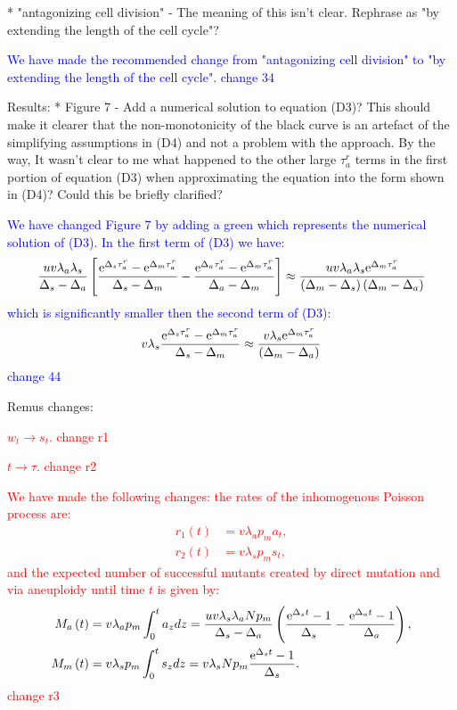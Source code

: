 \documentclass[12pt]{extarticle}
\newcommand{\e}{{\rm e}}
\begin{document}
* "antagonizing cell division" - The meaning of this isn't clear. Rephrase as "by extending the length of the cell cycle"?

\textcolor{blue}{We have made the recommended change from "antagonizing cell division" to "by extending the length of the cell cycle". change 34} 

Results:
* Figure 7 - Add a numerical solution to equation (D3)? This should make it clearer that the non-monotonicity of the black curve is an artefact of the simplifying assumptions in (D4) and not a problem with the approach. By the way, It wasn't clear to me what happened to the other large $\tau_a^r$ terms in the first portion of equation (D3) when approximating the equation into the form shown in (D4)? Could this be briefly clarified?

\textcolor{blue}{We have changed Figure 7 by adding a green which represents the numerical solution of (D3).  In the first term of (D3) we have:
\begin{align*}
\frac{uv\lambda_a\lambda_s}{\Delta_s-\Delta_a}\left[\frac{\e^{\Delta_s\tau_a^r}-\e^{\Delta_m\tau_a^r}}{\Delta_s-\Delta_m}-\frac{\e^{\Delta_a\tau_a^r}-\e^{\Delta_m\tau_a^r}}{\Delta_a-\Delta_m}\right]\approx\frac{uv\lambda_a\lambda_s\e^{\Delta_m\tau_a^r}}{\left(\Delta_m-\Delta_s\right)\left(\Delta_m-\Delta_a\right)}
\end{align*}
which is significantly smaller then the second term of (D3):
\begin{align*}
v\lambda_s\frac{\e^{\Delta_s\tau_a^r}-\e^{\Delta_m\tau_a^r}}{\Delta_s-\Delta_m}\approx\frac{v\lambda_s\e^{\Delta_m\tau_a^r}}{\left(\Delta_m-\Delta_a\right)}
\end{align*}
change 44} 

Remus changes:

\textcolor{red}{$w_t\rightarrow s_t$. change r1} 

\textcolor{red}{$t\rightarrow \tau$. change r2} 

\textcolor{red}{
We have made the following changes: the rates of the inhomogenous Poisson process are:
\begin{align*}
r_1\left(t\right)&=v\lambda_ap_ma_{t},\\ 
r_2\left(t\right)&=v\lambda_sp_ms_{t},
\end{align*}
and the expected number of successful mutants created by direct mutation and via aneuploidy until time $t$ is given by:
\begin{align*}
M_a\left(t\right)&=v\lambda_ap_m\int_0^ta_{z} d z = \frac{uv\lambda_s\lambda_aNp_m}{\Delta_s-\Delta_a}\left(\frac{\e^{\Delta_st}-1}{\Delta_s}-\frac{\e^{\Delta_at}-1}{\Delta_a}\right),\\ 
M_m\left(t\right)&=v\lambda_sp_m\int_0^ts_{z} d z = v\lambda_sNp_m\frac{\e^{\Delta_s t}-1}{\Delta_s}.
\end{align*}
change r3} 
\end{document}
